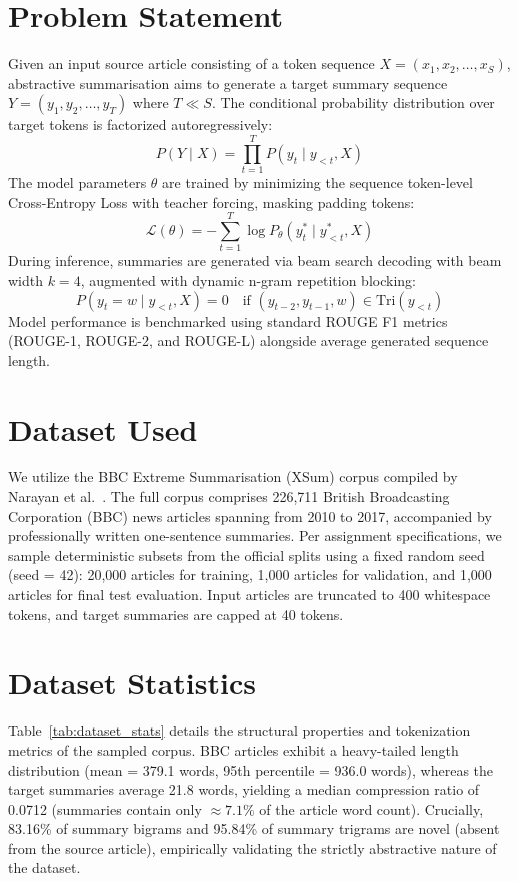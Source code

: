 \documentclass[conference]{IEEEtran}
\begin{document}
\section{Problem Statement}
Given an input source article consisting of a token sequence $X = (x_1, x_2, \dots, x_S)$, abstractive summarisation aims to generate a target summary sequence $Y = (y_1, y_2, \dots, y_T)$ where $T \ll S$. The conditional probability distribution over target tokens is factorized autoregressively:
\begin{equation}
P(Y \mid X) = \prod_{t=1}^{T} P(y_t \mid y_{<t}, X)
\end{equation}
The model parameters $\theta$ are trained by minimizing the sequence token-level Cross-Entropy Loss with teacher forcing, masking padding tokens:
\begin{equation}
\mathcal{L}(\theta) = - \sum_{t=1}^{T} \log P_\theta(y_t^* \mid y_{<t}^*, X)
\end{equation}
During inference, summaries are generated via beam search decoding with beam width $k=4$, augmented with dynamic n-gram repetition blocking:
\begin{equation}
P(y_t = w \mid y_{<t}, X) = 0 \quad \text{if } (y_{t-2}, y_{t-1}, w) \in \text{Tri}(y_{<t})
\end{equation}
Model performance is benchmarked using standard ROUGE F1 metrics (ROUGE-1, ROUGE-2, and ROUGE-L) alongside average generated sequence length.

\section{Dataset Used}
We utilize the BBC Extreme Summarisation (XSum) corpus compiled by Narayan et al.~\cite{narayan2018}. The full corpus comprises 226,711 British Broadcasting Corporation (BBC) news articles spanning from 2010 to 2017, accompanied by professionally written one-sentence summaries. Per assignment specifications, we sample deterministic subsets from the official splits using a fixed random seed (seed = 42): 20,000 articles for training, 1,000 articles for validation, and 1,000 articles for final test evaluation. Input articles are truncated to 400 whitespace tokens, and target summaries are capped at 40 tokens.

\section{Dataset Statistics}
Table~\ref{tab:dataset_stats} details the structural properties and tokenization metrics of the sampled corpus. BBC articles exhibit a heavy-tailed length distribution (mean = 379.1 words, 95th percentile = 936.0 words), whereas the target summaries average 21.8 words, yielding a median compression ratio of 0.0712 (summaries contain only $\approx 7.1\%$ of the article word count). Crucially, 83.16\% of summary bigrams and 95.84\% of summary trigrams are novel (absent from the source article), empirically validating the strictly abstractive nature of the dataset.
\end{document}
